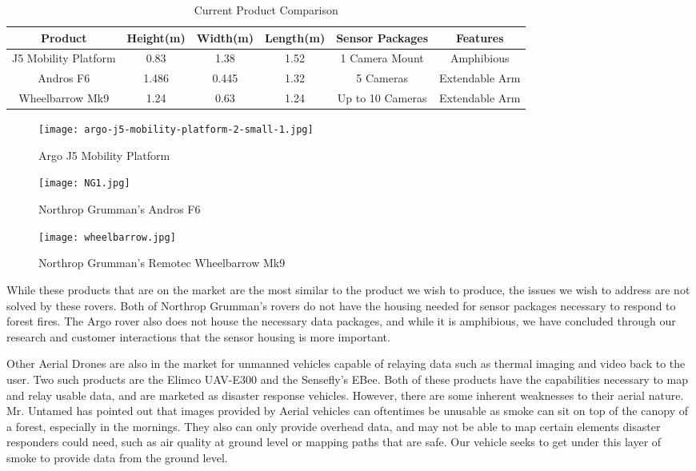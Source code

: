 \begin{table}[H]
	\begin{adjustwidth}{-.5in}{-.5in}
		\centering
		\begin{tabular}{c|c|c|c|c|c}
			Product & Height(m) & Width(m) & Length(m) & Sensor Packages & Features\\\hline
			J5 Mobility Platform & 0.83 & 1.38 & 1.52 & 1 Camera Mount & Amphibious\\
			Andros F6 & 1.486 & 0.445 & 1.32 & 5 Cameras & Extendable Arm \\
			Wheelbarrow Mk9 & 1.24 & 0.63 & 1.24 & Up to 10 Cameras & Extendable Arm\\
		\end{tabular}
		\caption{\label{tab:current} Current Product Comparison}
	\end{adjustwidth}
\end{table}

\begin{figure}[H]
	\centering
	\texttt{[image: argo-j5-mobility-platform-2-small-1.jpg]}
	\caption{Argo J5 Mobility Platform}
	\label{fig:ArgoPlatform}
\end{figure}


\begin{figure}[H]
	\centering
	\texttt{[image: NG1.jpg]}
	\caption{Northrop Grumman's Andros F6}
	\label{fig:NorthropAndros}
\end{figure}

\begin{figure}[H]
	\centering
	\texttt{[image: wheelbarrow.jpg]}
	\caption{Northrop Grumman's Remotec Wheelbarrow Mk9}
	\label{fig:NorthropWheelbarrow}
\end{figure}

While these products that are on the market are the most similar to the product we wish to produce, the issues we wish to address are not solved by these rovers. Both of Northrop Grumman's rovers do not have the housing needed for sensor packages necessary to respond to forest fires. The Argo rover also does not house the necessary data packages, and while it is amphibious, we have concluded through our research and customer interactions that the sensor housing is more important.

Other Aerial Drones are also in the market for unmanned vehicles capable of relaying data such as thermal imaging and video back to the user. Two such products are the Elimco UAV-E300 and the Sensefly's EBee. Both of these products have the capabilities necessary to map and relay usable data, and are marketed as disaster response vehicles. However, there are some inherent weaknesses to their aerial nature. Mr. Untamed has pointed out that images provided by Aerial vehicles can oftentimes be unusable as smoke can sit on top of the canopy of a forest, especially in the mornings. They also can only provide overhead data, and may not be able to map certain elements disaster responders could need, such as air quality at ground level or mapping paths that are safe. Our vehicle seeks to get under this layer of smoke to provide data from the ground level.

